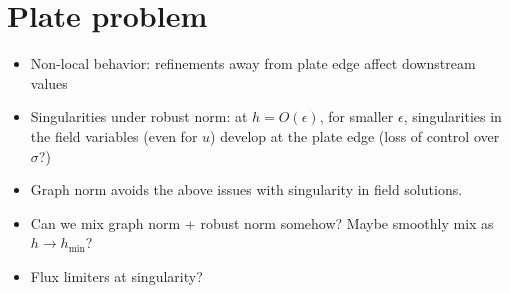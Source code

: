 %

\section{Plate problem}
\begin{itemize}
\item Non-local behavior: refinements away from plate edge affect downstream values
\item Singularities under robust norm: at $h = O(\epsilon)$, for smaller $\epsilon$, singularities in the field variables (even for $u$) develop at the plate edge (loss of control over $\sigma$?)  
\item Graph norm avoids the above issues with singularity in field solutions.  
\item Can we mix graph norm + robust norm somehow?  Maybe smoothly mix as $h\rightarrow h_{\min}$?
\item Flux limiters at singularity?
\end{itemize}



